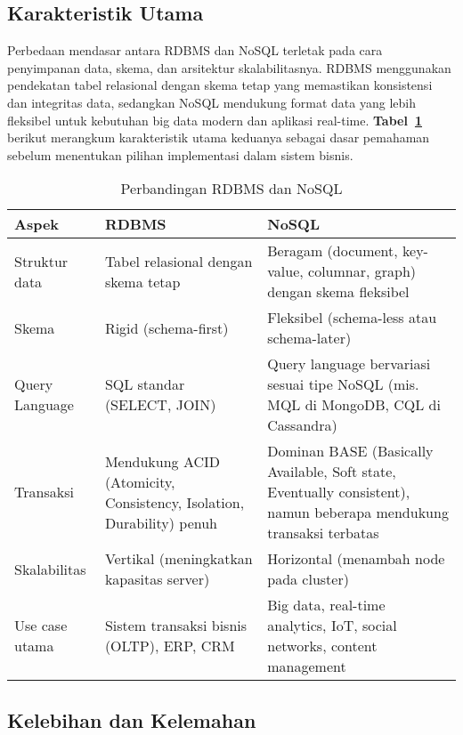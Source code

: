 \subsection{Karakteristik Utama}

Perbedaan mendasar antara RDBMS dan NoSQL terletak pada cara penyimpanan data, skema, dan arsitektur skalabilitasnya. RDBMS menggunakan pendekatan tabel relasional dengan skema tetap yang memastikan konsistensi dan integritas data, sedangkan NoSQL mendukung format data yang lebih fleksibel untuk kebutuhan big data modern dan aplikasi real-time. \textbf{Tabel~\ref{tab:rdbms_nosql_comparison}} berikut merangkum karakteristik utama keduanya sebagai dasar pemahaman sebelum menentukan pilihan implementasi dalam sistem bisnis.

\begin{table}[h]
	\centering
	\renewcommand{\arraystretch}{1.3}
	\caption{Perbandingan RDBMS dan NoSQL}
	\label{tab:rdbms_nosql_comparison}
	\begin{tabular}{|p{}|p{}|p{}|}
		\hline
		\textbf{Aspek} & \textbf{RDBMS} & \textbf{NoSQL} \\
		\hline
		Struktur data & Tabel relasional dengan skema tetap & Beragam (document, key-value, columnar, graph) dengan skema fleksibel \\
		\hline
		Skema & Rigid (schema-first) & Fleksibel (schema-less atau schema-later) \\
		\hline
		Query Language & SQL standar (SELECT, JOIN) & Query language bervariasi sesuai tipe NoSQL (mis. MQL di MongoDB, CQL di Cassandra) \\
		\hline
		Transaksi & Mendukung ACID (Atomicity, Consistency, Isolation, Durability) penuh & Dominan BASE (Basically Available, Soft state, Eventually consistent), namun beberapa mendukung transaksi terbatas \\
		\hline
		Skalabilitas & Vertikal (meningkatkan kapasitas server) & Horizontal (menambah node pada cluster) \\
		\hline
		Use case utama & Sistem transaksi bisnis (OLTP), ERP, CRM & Big data, real-time analytics, IoT, social networks, content management \\
		\hline
	\end{tabular}
\end{table}


\subsection{Kelebihan dan Kelemahan}

